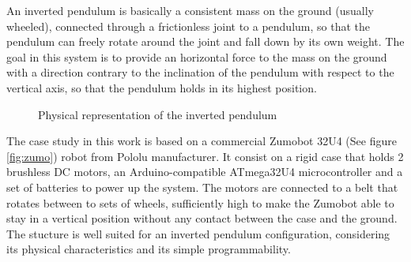 
An inverted pendulum is basically a consistent mass on the ground (usually wheeled), connected through a frictionless joint to a pendulum, so that the pendulum can freely rotate around the joint and fall down by its own weight. The goal in this system is to provide an horizontal force to the mass on the ground with a direction contrary to the inclination of the pendulum with respect to the vertical axis, so that the pendulum holds in its highest position.

\begin{figure}[h]
  \centering
  \caption{Physical representation of the inverted pendulum}\label{fig:diag}
\end{figure}

The case study in this work is based on a commercial Zumobot 32U4 (See figure \ref{fig:zumo}) robot from Pololu manufacturer. It consist on a rigid case that holds 2 brushless DC motors, an Arduino-compatible ATmega32U4 microcontroller and a set of batteries to power up the system. The motors are connected to a belt that rotates between to sets of wheels, sufficiently high to make the Zumobot able to stay in a vertical position without any contact between the case and the ground. The stucture is well suited for an inverted pendulum configuration, considering its physical characteristics and its simple programmability.


